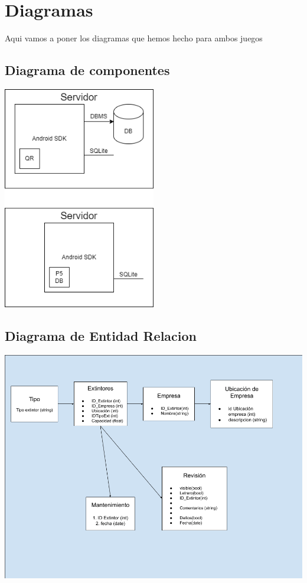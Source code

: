\documentclass[a4paper,twoside,10pt]{report}
\begin{document}
\chapter{Diagramas}

\par Aqui vamos a poner los diagramas que hemos hecho para ambos juegos

\section{Diagrama de componentes}

		\includegraphics[width=0.50\textwidth]{APPExtntor.png}


\section{Diagrama de Entidad Relacion}

\includegraphics[width=1.0\textwidth]{Gaming.png}
\end{document}

